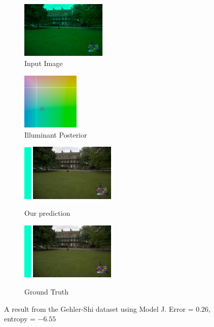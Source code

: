 \documentclass[10pt,twocolumn,letterpaper]{article}
\begin{document}
\begin{figure}[!]
\centering
  \begin{subfigure}[!]{1.7in}
    \includegraphics[width=1.6in]{figures/results/gehlershi/00000500_input.jpg}
    \caption{\footnotesize Input Image}
  \end{subfigure}
  \begin{subfigure}[!]{1.17in}
    \includegraphics[width=1.07in]{figures/results/gehlershi/00000500_chroma.png}
    \caption{\footnotesize Illuminant Posterior}
  \end{subfigure}
\begin{subfigure}[!]{1.9in}
    \includegraphics[width=0.133in]{figures/results/gehlershi/00000500_illum.png}\!
    \includegraphics[width=1.6in]{figures/results/gehlershi/00000500_prediction.jpg}
    \caption{\footnotesize Our prediction}
  \end{subfigure}
  \begin{subfigure}[!]{1.9in}
    \includegraphics[width=0.133in]{figures/results/gehlershi/00000500_illum_true.png}\!
    \includegraphics[width=1.6in]{figures/results/gehlershi/00000500_true.jpg}
    \caption{\footnotesize Ground Truth}
  \end{subfigure}
  \caption{
    A result from the Gehler-Shi dataset using Model J. Error = $0.26$\textdegree, entropy = $-6.55$
    \label{fig:results2}
  }
\end{figure}
\end{document}
